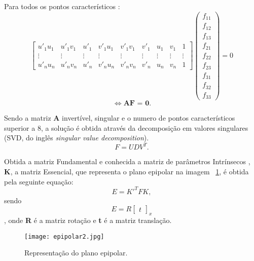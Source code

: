 	Para todos os pontos característicos : \[  \left[ \begin{array}{ccccccccc }
	u'_{1}u_{1} & u'_{1}v_{1} & u'_{1} & v'_{1}u_{1} & v'_{1}v_{1} & v'_{1} & u_{1} & v_{1} & 1 \\ 
	\vdots  & \vdots  & \vdots  & \vdots  & \vdots  & \vdots  & \vdots  & \vdots  & \vdots \\ 
	u'_nu_n & u'_nv_n & u'_n & v'_nu_n & v'_nv_n & v'_n & u_n & v_n & 1
	\end{array}\right] \left( \begin{array}{ccccccccc}
	f_{11}\\
	f_{12}\\
	f_{13}\\
	f_{21}\\
	f_{22}\\
	f_{23}\\
	f_{31}\\
	f_{32}\\
	f_{33}
	\end{array} \right) = 0 \]  \begin{equation}\label{equ:af=0}
	\Leftrightarrow \textbf{AF = 0}. 
	\end{equation}
	
	Sendo a matriz \textbf{A} invertível, singular  e o numero de pontos característicos superior a 8, a solução é obtida através da decomposição em valores singulares (SVD, do inglês \textit{singular value decomposition}).  \[ F = U D V^{T}.\]
	
		
	Obtida a matriz Fundamental e conhecida a matriz de parâmetros Intrínsecos , \textbf{K}, a matriz Essencial, que representa o plano epipolar na imagem ~\ref{fig:esseciallinemat}, é obtida pela seguinte equação:
	\[ E = {K}'^{T} F K, \]  sendo \[ E = R \left[\begin{array}{c}
	t
	\end{array}\right]_{x} \], onde \textbf{R} é a matriz rotação e \textbf{t} é a matriz translação.
	
	\begin{figure}[h!] %
		\begin{center}
			\leavevmode		
			\texttt{[image: epipolar2.jpg]}
			\caption{Representação do plano epipolar.}
			\label{fig:esseciallinemat}
		\end{center}
	\end{figure}
	
